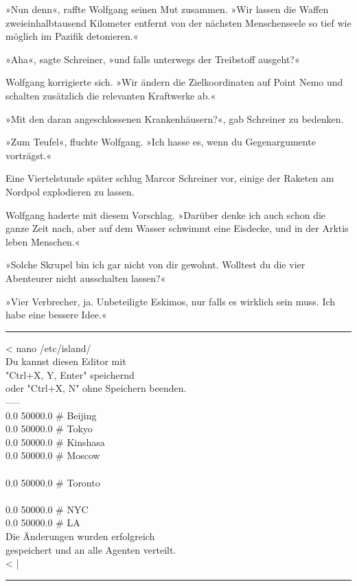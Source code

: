 »Nun denn«, raffte Wolfgang seinen Mut zusammen. »Wir lassen die Waffen zweieinhalbtausend Kilometer entfernt von der nächsten Menschenseele so tief wie möglich im Pazifik detonieren.«

»Aha«, sagte Schreiner, »und falls unterwegs der Treibstoff ausgeht?«

Wolfgang korrigierte sich. »Wir ändern die Zielkoordinaten auf Point Nemo und schalten zusätzlich die relevanten Kraftwerke ab.«

»Mit den daran angeschlossenen Krankenhäusern?«, gab Schreiner zu bedenken.

»Zum Teufel«, fluchte Wolfgang. »Ich hasse es, wenn du Gegenargumente vorträgst.«

Eine Viertelstunde später schlug Marcor Schreiner vor, einige der Raketen am Nordpol explodieren zu lassen.

Wolfgang haderte mit diesem Vorschlag. »Darüber denke ich auch schon die ganze Zeit nach, aber auf dem Wasser schwimmt eine Eisdecke, und in der Arktis leben Menschen.«

»Solche Skrupel bin ich gar nicht von dir gewohnt. Wolltest du die vier Abenteurer nicht ausschalten lassen?«

»Vier Verbrecher, ja. Unbeteiligte Eskimos, nur falls es wirklich sein muss. Ich habe eine bessere Idee.«

\noindent \parbox{\textwidth}{ \vspace{3ex} \hrule \vspace{3ex}

    \begin{tiny}
    \begin{ttfamily}

\noindent \textless{} nano /etc/island/\\
\noindent Du kannst diesen Editor mit\\
\noindent "Ctrl+X, Y, Enter" speichernd\\
\noindent oder "Ctrl+X, N" ohne Speichern beenden.\\
\noindent -----\\
 0.0 50000.0 \# Beijing\\
 0.0 50000.0 \# Tokyo\\
 0.0 50000.0 \# Kinshasa\\
 0.0 50000.0 \# Moscow\\
\noindent […]\\
 0.0 50000.0 \# Toronto\\
\noindent […]\\
 0.0 50000.0 \# NYC\\
 0.0 50000.0 \# LA\\
\noindent Die Änderungen wurden erfolgreich\\
\noindent gespeichert und an alle Agenten verteilt.\\
\noindent \textless{} |

    \end{ttfamily}
    \end{tiny}

\vspace{3ex} \hrule \vspace{3ex} }

